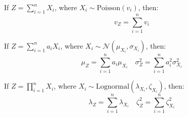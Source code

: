 \documentclass[10pt,twoside]{article}
\newcommand{\?}{\stackrel{?}{=}}
\newcommand{\la}{\lambda}
\begin{document}
If $Z = \sum_{i=1}^n X_i$, where $X_i\sim \text{Poisson}(v_i)$, then:
\begin{equation}
  \label{eq:21}
  v_Z= \sum_{i=1}^n v_i
\end{equation}

If $Z  = \sum_{i=1}^n a_i X_i$, where $X_i \sim \mathcal{N}(\mu_{X_i},\sigma_{X_i})$, then:
\begin{equation}
  \label{eq:14}
\mu_Z = \sum_{i=1}^na_i\mu_{X_i} \quad  \sigma_Z^2 = \sum_{i=1}^n a_i^2\sigma_{X_i}^2
\end{equation}

If $Z = \prod_{i=1}^nX_i$, where $X_i \sim \text{Lognormal}(\la_{X_i},\zeta_{X_i})$, then:
\begin{equation}
  \label{eq:22}
  \la_Z = \sum_{i=1}^n\la_{X_i} \quad \zeta_Z^2 = \sum_{i=1}^n\zeta_{X_i}^2
\end{equation}
\end{document}
